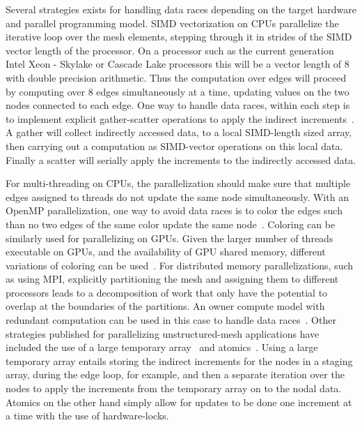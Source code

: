 \documentclass[runningheads]{llncs}
\begin{document}

Several strategies exists for handling data races depending on the target 
hardware and parallel programming model. SIMD vectorization on CPUs parallelize 
the iterative loop over the mesh elements, stepping through it in strides of the 
SIMD vector length of the processor. On a processor such as the current 
generation Intel Xeon - Skylake or Cascade Lake processors this will be a vector 
length of 8 with double precision arithmetic. Thus the computation over edges 
will proceed by computing over 8 edges simultaneously at a time, updating values 
on the two nodes connected to each edge. One way to handle data races, within 
each step is to implement explicit gather-scatter operations to apply the 
indirect increments~\cite{Mudalige2016}. A gather will collect indirectly 
accessed data, to a local SIMD-length sized array, then carrying out a 
computation as SIMD-vector operations on this local data. Finally a scatter will 
serially apply the increments to the indirectly accessed data. 

For multi-threading on CPUs, the parallelization should make sure that multiple 
edges assigned to threads do not update the same node simultaneously. With an 
OpenMP parallelization, one way to avoid data races is to color the edges such 
than no two edges of the same color update the same node~\cite{InPar2012}. 
Coloring can be similarly used for parallelizing on GPUs. Given the larger 
number of threads executable on GPUs, and the availability of GPU shared 
memory, different variations of coloring can be used~\cite{SULYOK201950}. For 
distributed memory parallelizations, such as using MPI, explicitly partitioning 
the mesh and assigning them to different processors leads to a decomposition 
of work that only have the potential to overlap at the boundaries of the 
partitions. An owner compute model with redundant computation can be used in 
this case to handle data races~\cite{InPar2012}. Other strategies published for 
parallelizing unstructured-mesh applications have included the use of a large 
temporary array~\cite{LULESH:spec} and atomics~\cite{SULYOK201950}. Using a 
large temporary array entails storing the indirect increments for the nodes in a 
staging array, during the edge loop, for example, and then a separate 
iteration over the nodes to apply the increments from the temporary array on to 
the nodal data. Atomics on the other hand simply allow for updates to be done 
one increment at a time with the use of hardware-locks. 
\end{document}
